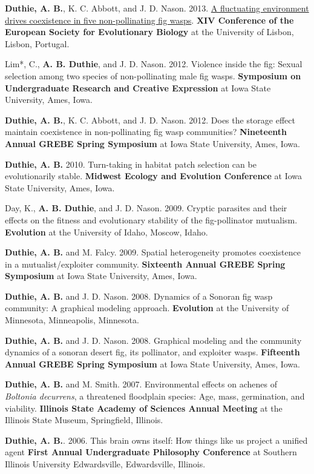 \documentclass[letterpaper]{article}
\renewenvironment{itemize}{
  \begin{list}{}{
    \setlength{\leftmargin}{1.5em}
  }
}{
  \end{list}
}
\begin{document}
\begin{itemize}
\item {\bf Duthie, A. B.}, K. C. Abbott, and J. D. Nason. 2013. \href{https://www.youtube.com/watch?v=8Oi48FdaLXY}{A fluctuating environment drives coexistence in five non-pollinating fig wasps}. {\bf XIV Conference of the European Society for Evolutionary Biology} at the University of Lisbon, Lisbon, Portugal.
\item Lim*, C., {\bf A. B. Duthie}, and J. D. Nason. 2012. Violence inside the fig: Sexual selection among two species of non-pollinating male fig wasps. {\bf Symposium on Undergraduate Research and Creative Expression} at Iowa State University, Ames, Iowa.
\item {\bf Duthie, A. B.}, K. C. Abbott, and J. D. Nason. 2012. Does the storage effect maintain coexistence in non-pollinating fig wasp communities? {\bf Nineteenth Annual GREBE Spring Symposium} at Iowa State University, Ames, Iowa.
\item {\bf Duthie, A. B.} 2010. Turn-taking in habitat patch selection can be evolutionarily stable. {\bf Midwest Ecology and Evolution Conference} at Iowa State University, Ames, Iowa.
\item Day, K., {\bf A. B. Duthie}, and J. D. Nason. 2009. Cryptic parasites and their effects on the fitness and evolutionary stability of the fig-pollinator mutualism. {\bf Evolution} at the University of Idaho, Moscow, Idaho.
\item {\bf Duthie, A. B.} and M. Falcy. 2009. Spatial heterogeneity promotes coexistence in a mutualist/exploiter community. {\bf Sixteenth Annual GREBE Spring Symposium} at Iowa State University, Ames, Iowa.
\item {\bf Duthie, A. B.} and J. D. Nason. 2008. Dynamics of a Sonoran fig wasp community: A graphical modeling approach. {\bf Evolution} at the University of Minnesota, Minneapolis, Minnesota.
\item {\bf Duthie, A. B.} and J. D. Nason. 2008. Graphical modeling and the community dynamics of a sonoran desert fig, its pollinator, and exploiter wasps. {\bf Fifteenth Annual GREBE Spring Symposium} at Iowa State University, Ames, Iowa.
\item {\bf Duthie, A. B.} and M. Smith. 2007. Environmental effects on achenes of {\it Boltonia decurrens}, a threatened floodplain species: Age, mass, germination, and viability. {\bf Illinois State Academy of Sciences Annual Meeting} at the Illinois State Museum, Springfield, Illinois.
\item {\bf Duthie, A. B.}. 2006. This brain owns itself: How things like us project a unified agent {\bf First Annual Undergraduate Philosophy Conference} at Southern Illinois University Edwardsville, Edwardsville, Illinois.
\end{itemize}
\end{document}
